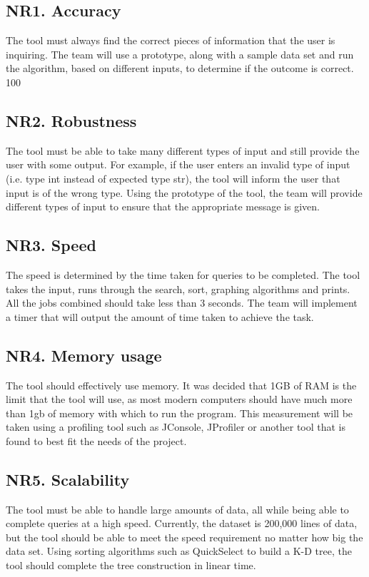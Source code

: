 \documentclass{article}
\begin{document}
\subsection{NR1. Accuracy}
The tool must always find the correct pieces of information that the user is inquiring. The team will use a prototype, along with a sample data set and run the algorithm, based on different inputs, to determine if the outcome is correct. 100%

\subsection{NR2. Robustness}
The tool must be able to take many different types of input and still provide the user with some output. For example, if the user enters an invalid type of input (i.e. type int instead of expected type str), the tool will inform the user that input is of the wrong type. Using the prototype of the tool, the team will provide different types of input to ensure that the appropriate message is given.

\subsection{NR3. Speed}
The speed is determined by the time taken for queries to be completed. The tool takes the input, runs through the search, sort, graphing algorithms and prints. All the jobs combined should take less than 3 seconds. The team will implement a timer that will output the amount of time taken to achieve the task.

\subsection{NR4. Memory usage}
The tool should effectively use memory. It was decided that 1GB of RAM is the limit that the tool will use, as most modern computers should have much more than 1gb of memory with which to run the program. This measurement will be taken using a profiling tool such as JConsole, JProfiler or another tool that is found to best fit the needs of the project.

\subsection{NR5. Scalability}
The tool must be able to handle large amounts of data, all while being able to complete queries at a high speed. Currently, the dataset is 200,000 lines of data, but the tool should be able to meet the speed requirement no matter how big the data set. Using sorting algorithms such as QuickSelect to build a K-D tree, the tool should complete the tree construction in linear time.
\end{document}

